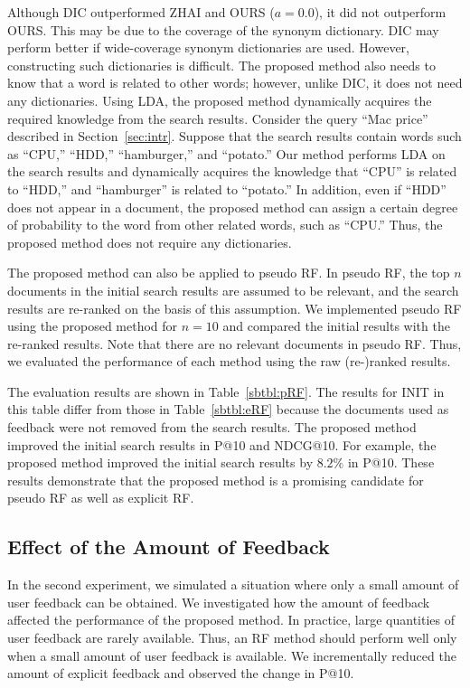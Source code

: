 \documentclass[english]{jnlp_1.4_rep}
\begin{document}
Although DIC outperformed ZHAI and OURS ($a = 0.0$), it did not
outperform OURS. This may be due to the coverage of the synonym
dictionary. DIC may perform better if wide-coverage synonym dictionaries
are used. However, constructing such dictionaries is difficult. The
proposed method also needs to know that a word is related to other
words; however, unlike DIC, it does not need any dictionaries. Using
LDA, the proposed method dynamically acquires the required knowledge
from the search results. Consider the query ``Mac price'' described in
Section~\ref{sec:intr}. Suppose that the search results contain words
such as ``CPU,'' ``HDD,'' ``hamburger,'' and ``potato.'' Our method
performs LDA on the search results and dynamically acquires the
knowledge that ``CPU'' is related to ``HDD,'' and ``hamburger'' is
related to ``potato.'' In addition, even if ``HDD'' does not appear in a
document, the proposed method can assign a certain degree of probability
to the word from other related words, such as ``CPU.'' Thus, the
proposed method does not require any dictionaries.

The proposed method can also be applied to pseudo RF. In pseudo RF, the
top $n$ documents in the initial search results are assumed to be
relevant, and the search results are re-ranked on the basis of this
assumption. We implemented pseudo RF using the proposed method for $n =
10$ and compared the initial results with the re-ranked results. Note
that there are no relevant documents in pseudo RF. Thus, we evaluated
the performance of each method using the raw (re-)ranked results.

The evaluation results are shown in Table~\ref{sbtbl:pRF}. The results
for INIT in this table differ from those in Table~\ref{sbtbl:eRF}
because the documents used as feedback were not removed from the search
results. The proposed method improved the initial search results in P@10
and NDCG@10. For example, the proposed method improved the initial
search results by $8.2\%$ in P@10. These results demonstrate that the
proposed method is a promising candidate for pseudo RF as well as
explicit RF.


\subsection{Effect of the Amount of Feedback}
\label{ssec:experiment2}

In the second experiment, we simulated a situation where only a small
amount of user feedback can be obtained. We investigated how the amount
of feedback affected the performance of the proposed method. In
practice, large quantities of user feedback are rarely available. Thus,
an RF method should perform well only when a small amount of user
feedback is available. We incrementally reduced the amount of explicit
feedback and observed the change in P@10.
\end{document}
